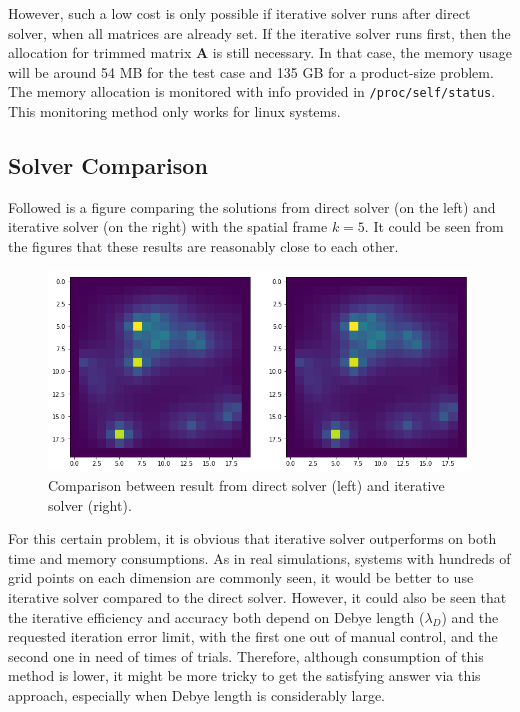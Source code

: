 \documentclass{article}
\begin{document}
\begin{spacing}{1.1}
However, such a low cost is only possible if iterative solver runs after direct solver, when all matrices are already set. If the iterative solver runs first, then the allocation for trimmed matrix $\mathbf{A}$ is still necessary. In that case, the memory usage will be around 54 MB for the test case and 135 GB for a product-size problem. The memory allocation is monitored with info provided in \texttt{/proc/self/status}. This monitoring method only works for linux systems.



\subsection{Solver Comparison}

Followed is a figure comparing the solutions from direct solver (on the left) and iterative solver (on the right) with the spatial frame $k=5$. It could be seen from the figures that these results are reasonably close to each other.

\begin{figure}[H]
  \includegraphics[width=\linewidth]{output/testcase.png}
  \caption{Comparison between result from direct solver (left) and iterative solver (right).}
  \label{fig-testcase}
\end{figure}

For this certain problem, it is obvious that iterative solver outperforms on both time and memory consumptions. As in real simulations, systems with hundreds of grid points on each dimension are commonly seen, it would be better to use iterative solver compared to the direct solver. However, it could also be seen that the iterative efficiency and accuracy both depend on Debye length ($\lambda_D$) and the requested iteration error limit, with the first one out of manual control, and the second one in need of times of trials. Therefore, although consumption of this method is lower, it might be more tricky to get the satisfying answer via this approach, especially when Debye length is considerably large.


\end{spacing}
\end{document}
